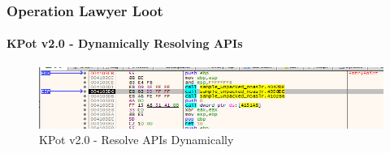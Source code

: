 \documentclass[aspectratio=169]{beamer}
\begin{document}
{
\begin{frame}
  \frametitle{Operation Lawyer Loot}
  \framesubtitle{KPot v2.0 - Dynamically Resolving APIs}
  \begin{figure}
    \includegraphics[width=14cm]{kpot-resolve-apis-debug}
    \caption{KPot v2.0 - Resolve APIs Dynamically}
  \end{figure}
\end{frame}
}
\end{document}
